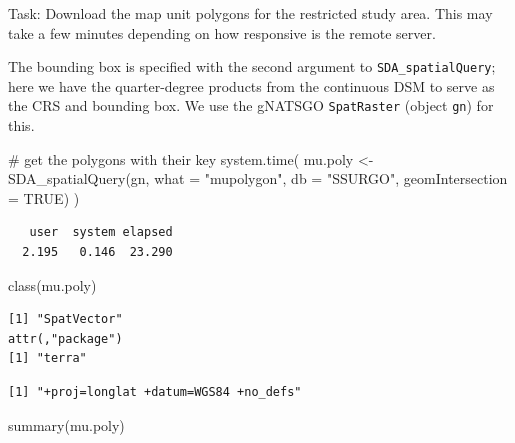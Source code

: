\documentclass[
  letterpaper,
  DIV=11,
  numbers=noendperiod]{scrartcl}
\newenvironment{Shaded}{\begin{snugshade}}{\end{snugshade}}
\newcommand{\AttributeTok}[1]{\textcolor[rgb]{0.40,0.45,0.13}{#1}}
\newcommand{\CommentTok}[1]{\textcolor[rgb]{0.37,0.37,0.37}{#1}}
\newcommand{\ConstantTok}[1]{\textcolor[rgb]{0.56,0.35,0.01}{#1}}
\newcommand{\FunctionTok}[1]{\textcolor[rgb]{0.28,0.35,0.67}{#1}}
\newcommand{\NormalTok}[1]{\textcolor[rgb]{0.00,0.23,0.31}{#1}}
\newcommand{\OtherTok}[1]{\textcolor[rgb]{0.00,0.23,0.31}{#1}}
\newcommand{\SpecialCharTok}[1]{\textcolor[rgb]{0.37,0.37,0.37}{#1}}
\newcommand{\StringTok}[1]{\textcolor[rgb]{0.13,0.47,0.30}{#1}}
\begin{document}
Task: Download the map unit polygons for the restricted study area. This
may take a few minutes depending on how responsive is the remote server.

The bounding box is specified with the second argument to
\texttt{SDA\_spatialQuery}; here we have the quarter-degree products
from the continuous DSM to serve as the CRS and bounding box. We use the
gNATSGO \texttt{SpatRaster} (object \texttt{gn}) for this.

\begin{Shaded}
\begin{Highlighting}[]
\CommentTok{\# get the polygons with their key}
\FunctionTok{system.time}\NormalTok{(}
\NormalTok{  mu.poly }\OtherTok{\textless{}{-}} \FunctionTok{SDA\_spatialQuery}\NormalTok{(gn, }
                            \AttributeTok{what =} \StringTok{"mupolygon"}\NormalTok{, }
                            \AttributeTok{db =} \StringTok{"SSURGO"}\NormalTok{, }
                            \AttributeTok{geomIntersection =} \ConstantTok{TRUE}\NormalTok{)}
\NormalTok{)}
\end{Highlighting}
\end{Shaded}

\begin{verbatim}
   user  system elapsed 
  2.195   0.146  23.290 
\end{verbatim}

\begin{Shaded}
\begin{Highlighting}[]
\FunctionTok{class}\NormalTok{(mu.poly)}
\end{Highlighting}
\end{Shaded}

\begin{verbatim}
[1] "SpatVector"
attr(,"package")
[1] "terra"
\end{verbatim}

\begin{Shaded}
\end{Shaded}

\begin{verbatim}
[1] "+proj=longlat +datum=WGS84 +no_defs"
\end{verbatim}

\begin{Shaded}
\begin{Highlighting}[]
\FunctionTok{summary}\NormalTok{(mu.poly)}
\end{Highlighting}
\end{Shaded}
\end{document}
